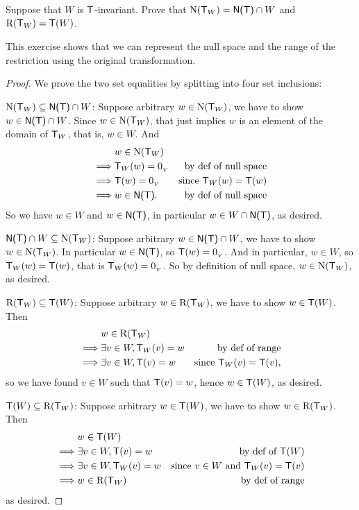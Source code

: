 \begin{exercise} \label{exercise 2.1.33}
Suppose that \(W\) is \(\textsf{T}\)-invariant.
Prove that \(\mathrm{N}(\textsf{T}_W) = \textsf{N(T)} \cap W\) and \(\mathrm{R}(\textsf{T}_W) = \textsf{T}(W)\).
\end{exercise}

\begin{note}
This exercise shows that we can represent the null space and the range of the restriction using the original transformation.
\end{note}

\begin{proof} We prove the two set equalities by splitting into four set inclusions:

\(\mathrm{N}(\textsf{T}_W) \subseteq \textsf{N(T)} \cap W\):
Suppose arbitrary \(w \in \mathrm{N}(\textsf{T}_W)\), we have to show \(w \in \textsf{N(T)} \cap W\).
Since \(w \in \mathrm{N}(\textsf{T}_W)\), that just implies \(w\) is an element of the domain of \(\textsf{T}_W\), that is, \(w \in W\).
And
\begin{align*}
             & w \in \mathrm{N}(\textsf{T}_W) \\
    \implies & \textsf{T}_W(w) = 0_{_V} & \text{by def of null space} \\
    \implies & \textsf{T}(w) = 0_{_V} & \text{since \(\textsf{T}_W(w) = \textsf{T}(w)\)} \\
    \implies & w \in \textsf{N(T)}. & \text{by def of null space}
\end{align*}
So we have \(w \in W\) and \(w \in \textsf{N(T)}\), in particular \(w \in W \cap \textsf{N(T)}\), as desired.

\(\textsf{N(T)} \cap W \subseteq \mathrm{N}(\textsf{T}_W)\):
Suppose arbitrary \(w \in \textsf{N(T)} \cap W\), we have to show \(w \in \mathrm{N}(\textsf{T}_W)\).
In particular \(w \in \textsf{N(T)}\), so \(\textsf{T}(w) = 0_{_V}\).
And in particular, \(w \in W\), so \(\textsf{T}_W(w) = \textsf{T}(w)\), that is \(\textsf{T}_W(w) = 0_{_V}\).
So by definition of null space, \(w \in \mathrm{N}(\textsf{T}_W)\), as desired.

\(\mathrm{R}(\textsf{T}_W) \subseteq \textsf{T}(W)\):
Suppose arbitrary \(w \in \mathrm{R}(\textsf{T}_W)\), we have to show \(w \in \textsf{T}(W)\).
Then
\begin{align*}
             & w \in \mathrm{R}(\textsf{T}_W) \\
    \implies & \exists v \in W, \textsf{T}_W(v) = w & \text{by def of range} \\
    \implies & \exists v \in W, \textsf{T}(v) = w & \text{since \(\textsf{T}_W(v) = \textsf{T}(v)\)},
\end{align*}
so we have found \(v \in W\) such that \(\textsf{T}(v) = w\), hence \(w \in \textsf{T}(W)\), as desired.

\(\textsf{T}(W) \subseteq \mathrm{R}(\textsf{T}_W)\):
Suppose arbitrary \(w \in \textsf{T}(W)\), we have to show \(w \in \mathrm{R}(\textsf{T}_W)\).
Then
\begin{align*}
             & w \in \textsf{T}(W) \\
    \implies & \exists v \in W, \textsf{T}(v) = w & \text{by def of \(\textsf{T}(W)\)} \\
    \implies & \exists v \in W, \textsf{T}_W(v) = w & \text{since \(v \in W\) and \(\textsf{T}_W(v) = \textsf{T}(v)\)} \\
    \implies & w \in \mathrm{R}(\textsf{T}_W) & \text{by def of range}
\end{align*}
as desired.
\end{proof}

